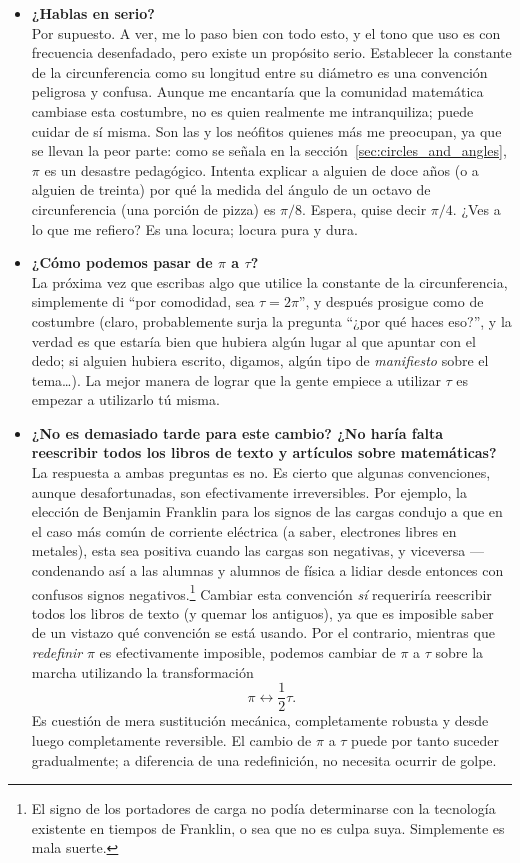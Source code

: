\begin{itemize}

  \item \textbf{¿Hablas en serio?} \\ Por supuesto. A ver, me lo paso bien con todo esto, y el tono que uso es con frecuencia desenfadado, pero existe un propósito serio. Establecer la constante de la circunferencia como su longitud entre su diámetro es una convención peligrosa y confusa. Aunque me encantaría que la comunidad matemática cambiase esta costumbre, no es quien realmente me intranquiliza; puede cuidar de sí misma. Son las y los neófitos quienes más me preocupan, ya que se llevan la peor parte: como se señala en la sección~\ref{sec:circles_and_angles}, $\pi$ es un desastre pedagógico. Intenta explicar a alguien de doce años (o a alguien de treinta) por qué la medida del ángulo de un octavo de circunferencia (una porción de pizza) es $\pi/8$. Espera, quise decir $\pi/4$. ¿Ves a lo que me refiero? Es una locura; locura pura y dura.

  \item \textbf{¿Cómo podemos pasar de $\pi$ a $\tau$?} \\ La próxima vez que escribas algo que utilice la constante de la circunferencia, simplemente di ``por comodidad, sea $\tau = 2\pi$'', y después prosigue como de costumbre (claro, probablemente surja la pregunta ``¿por qué haces eso?'', y la verdad es que estaría bien que hubiera algún lugar al que apuntar con el dedo; si alguien hubiera escrito, digamos, algún tipo de \emph{manifiesto} sobre el tema\ldots). La mejor manera de lograr que la gente empiece a utilizar $\tau$ es empezar a utilizarlo tú misma.

  \item \textbf{¿No es demasiado tarde para este cambio? ¿No haría falta reescribir todos los libros de texto y artículos sobre matemáticas?} \\ La respuesta a ambas preguntas es no. Es cierto que algunas convenciones, aunque desafortunadas, son efectivamente irreversibles. Por ejemplo, la elección de Benjamin Franklin para los signos de las cargas condujo a que en el caso más común de corriente eléctrica (a saber, electrones libres en metales), esta sea positiva cuando las cargas son negativas, y viceversa ---condenando así a las alumnas y alumnos de física a lidiar desde entonces con confusos signos negativos.\footnote{El signo de los portadores de carga no podía determinarse con la tecnología existente en tiempos de Franklin, o sea que no es culpa suya. Simplemente es mala suerte.} Cambiar esta convención \emph{sí} requeriría reescribir todos los libros de texto (y quemar los antiguos), ya que es imposible saber de un vistazo qué convención se está usando. Por el contrario, mientras que \emph{redefinir} $\pi$ es efectivamente imposible, podemos cambiar de $\pi$ a $\tau$ sobre la marcha utilizando la transformación \[ \pi \leftrightarrow \textstyle{\frac{1}{2}}\tau. \] Es cuestión de mera sustitución mecánica, completamente robusta y desde luego completamente reversible. El cambio de  $\pi$ a $\tau$ puede por tanto suceder gradualmente; a diferencia de una redefinición, no necesita ocurrir de golpe.


\end{itemize}
